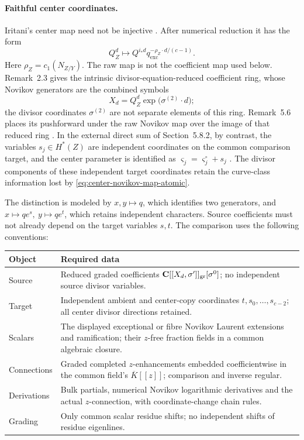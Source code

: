 \paragraph{Faithful center coordinates.}
Iritani's center map need not be injective
\cite[(5.15)]{IritaniBlowup}.  After numerical reduction it has the form
\begin{equation}
 Q_Z^d\longmapsto
 Q^{i_*d}q_{\mathrm{exc}}^{-\rho_Z\cdot d/(c-1)}.
 \label{eq:center-novikov-map-atomic}
\end{equation}
Here \(\rho_Z=c_1(N_{Z/Y})\).
The raw map is not the coefficient map used below.  Remark~2.3 gives the
intrinsic divisor-equation-reduced coefficient ring, whose Novikov generators
are the combined symbols
\[
 X_d=Q_Z^d\exp\!\bigl(\sigma^{(2)}\cdot d\bigr);
\]
the divisor coordinates \(\sigma^{(2)}\) are not separate elements of this
ring.  Remark~5.6 places its pushforward under the raw Novikov map over the
image of that reduced ring \cite[Remarks~2.3 and~5.6]{IritaniBlowup}.  In the
external direct sum of Section~5.8.2, by contrast, the variables
\(s_j\in H^*(Z)\) are independent coordinates on the common comparison target,
and the center parameter is identified as
\(\varsigma_j=\varsigma_j^\circ+s_j\)
\cite[(5.47)--(5.48)]{IritaniBlowup}.  The divisor components of these
independent target coordinates retain the curve-class information lost by
\eqref{eq:center-novikov-map-atomic}.

The distinction is modeled by \(x,y\mapsto q\), which identifies two
generators, and \(x\mapsto qe^s,\ y\mapsto qe^t\), which retains independent
characters.  Source coefficients must not already depend on the target
variables \(s,t\).  The comparison uses the following conventions:
\begin{center}
\small
\begin{tabular}{@{}p{.22\linewidth}p{.72\linewidth}@{}}
\toprule
Object & Required data \\
\midrule
Source & Reduced graded coefficients \(\mathbf C[[X_d,\sigma']]_{\rm gr}[\sigma^0]\);
no independent source divisor variables. \\
Target & Independent ambient and center-copy coordinates \(t,s_0,\ldots,s_{c-2}\);
all center divisor directions retained. \\
Scalars & The displayed exceptional or fibre Novikov Laurent extensions and
ramification; their \(z\)-free fraction fields in a common algebraic closure. \\
Connections & Graded completed \(z\)-enhancements embedded coefficientwise
in the common field's \(\overline K[[z]]\); comparison and inverse regular. \\
Derivations & Bulk partials, numerical Novikov logarithmic derivatives and
the actual \(z\)-connection, with coordinate-change chain rules. \\
Grading & Only common scalar residue shifts; no independent shifts of residue
eigenlines. \\
\bottomrule
\end{tabular}
\end{center}

